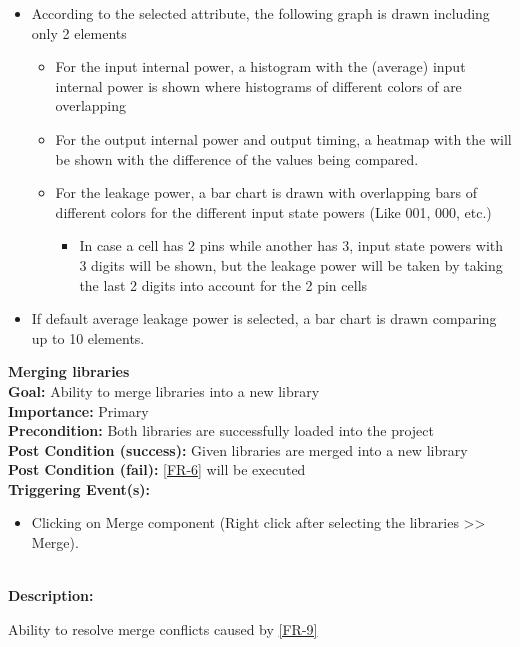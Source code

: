 \documentclass[10pt,a4paper]{report}
\newcommand{\precondition}[1]{
    \textbf{Precondition: } #1 \leavevmode \\
}
\newcommand{\FRDescription}[8]{
    \textbf{#1} \leavevmode \\
    \textbf{Goal: } #2 \leavevmode \\
    \textbf{Importance: } #3 \leavevmode \\
    \precondition{#4}
    \textbf{Post Condition (success): } #5 \leavevmode \\
    \textbf{Post Condition (fail): } #6 \leavevmode \\
    \textbf{Triggering Event(s): } #7 \leavevmode \\
    \textbf{Description: } \leavevmode \\ 
    #8}
\begin{document}
\begin{FR}
{\begin{itemize}
\begin{itemize}
            \item Like in \label{FR-Display of pins} there are checkboxes on the left of the input pins that signify to which input pin the timing and internal power of the output pins are based on (The first one is selected by default)
        \end{itemize}
        \item According to the selected attribute, the following graph is drawn including only 2 elements
        \begin{itemize}
            \item For the input internal power, a histogram with the (average) input internal power is shown where histograms of different colors of are overlapping
            \item For the output internal power and output timing, a heatmap with the will be shown with the difference of the values being compared.
            \item For the leakage power, a bar chart is drawn with overlapping bars of different colors for the different input state powers (Like 001, 000, etc.)
            \begin{itemize}
                \item In case a cell has 2 pins while another has 3, input state powers with 3 digits will be shown, but the leakage power will be taken by taking the last 2 digits into account for the 2 pin cells
            \end{itemize}
        \end{itemize}
        \item If default average leakage power is selected, a bar chart is drawn comparing up to 10 elements.
    \end{itemize}}
    \item \FRDescription{Merging libraries}
    {Ability to merge libraries into a new library}
    {Primary}
    {Both libraries are successfully loaded into the project}
    {Given libraries are merged into a new library}
    {\ref{FR-6} will be executed}
    {\begin{itemize}
        \item Clicking on Merge component (Right click after selecting the libraries >> Merge).
    \end{itemize}}
    \item {}
    {Ability to resolve merge conflicts caused by \ref{FR-9}}

\end{FR}
\end{document}
